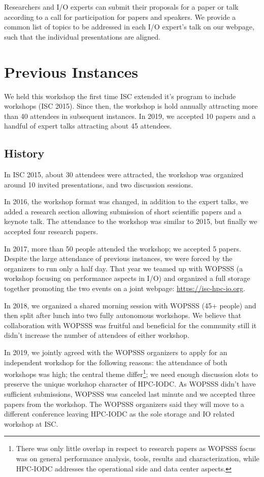 \documentclass[a4paper,10pt]{article}
\begin{document}
Researchers and I/O experts can submit their proposals for a paper or talk according to a call for participation for papers and speakers.
We provide a common list of topics to be addressed in each I/O expert's talk on our webpage, such that the individual presentations are aligned.


\section{Previous Instances}

We held this workshop the first time ISC extended it's program to include workshops (ISC 2015).
Since then, the workshop is hold annually attracting more than 40 attendees in subsequent  instances.
In 2019, we accepted 10 papers and a handful of expert talks attracting about 45 attendees.

\subsection{History}

In ISC 2015, about 30 attendees were attracted, the workshop was organized around 10 invited presentations, and two discussion sessions.

In 2016, the workshop format was changed, in addition to the expert talks, we added a research section allowing submission of short scientific papers and a keynote talk.
The attendance to the workshop was similar to 2015, but finally we accepted four research papers.

In 2017, more than 50 people attended the workshop; we accepted 5 papers. %
Despite the large attendance of previous instances, we were forced by the organizers to run only a half day.
That year we teamed up with WOPSSS (a workshop focusing on performance aspects in I/O) and organized a full storage together promoting the two events on a joint webpage: \url{https://isc-hpc-io.org}.

In 2018, we organized a shared morning session with WOPSSS (45+ people) and then split after lunch into two fully autonomous workshops.
We believe that collaboration with WOPSSS was fruitful and beneficial for the community still it didn't increase the number of attendees of either workshop.

In 2019, we jointly agreed with the WOPSSS organizers to apply for an independent workshop for the following reasons: the attendance of both workshops was high; the central theme differ\footnote{There was only little overlap in respect to research papers as WOPSSS focus was on general performance analysis, tools, results and characterization, while HPC-IODC addresses the operational side and data center aspects.}; we need enough discussion slots to preserve the unique workshop character of HPC-IODC.
As WOPSSS didn't have sufficient submissions, WOPSSS was canceled last minute and we accepted three papers from the workshop.
The WOPSSS organizers said they will move to a different conference leaving HPC-IODC as the sole storage and IO related workshop at ISC.
\end{document}
